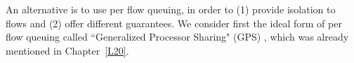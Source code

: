 An alternative \cite{dks90,keshav-96} is to use per flow queuing,
in order to (1) provide isolation to flows and (2) offer different
guarantees. We consider first the ideal form of per flow queuing
called ``Generalized Processor Sharing" (GPS) \cite{pg93}, which
was already mentioned in Chapter~\ref{L20}.

%
%
%
